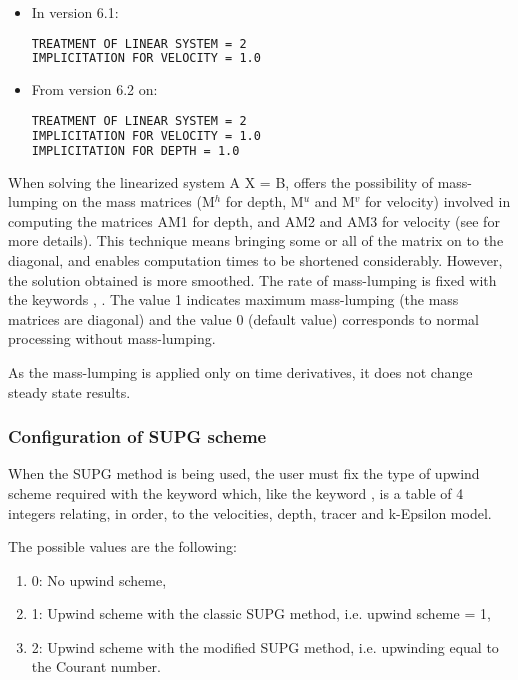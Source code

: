 \begin{itemize}
\item  In version 6.1:
\begin{lstlisting}[language=bash]
TREATMENT OF LINEAR SYSTEM = 2
IMPLICITATION FOR VELOCITY = 1.0
\end{lstlisting}
\item  From version 6.2 on:
\begin{lstlisting}[language=bash]
TREATMENT OF LINEAR SYSTEM = 2
IMPLICITATION FOR VELOCITY = 1.0
IMPLICITATION FOR DEPTH = 1.0
\end{lstlisting}
\end{itemize}

  When solving the linearized system A X = B,  offers the possibility of mass-lumping on the mass matrices (M${}^{h}$ for depth, M${}^{u}$ and M${}^{v}$ for velocity) involved in computing the matrices AM1 for depth, and AM2 and AM3 for velocity (see \cite{Hervouet2007} for more details). This technique means bringing some or all of the matrix on to the diagonal, and enables computation times to be shortened considerably. However, the solution obtained is more smoothed. The rate of mass-lumping is fixed with the keywords , . The value 1 indicates maximum mass-lumping (the mass matrices are diagonal) and the value 0 (default value) corresponds to normal processing without mass-lumping.

 As the mass-lumping is applied only on time derivatives, it does not change steady state results.
\subsubsection{  Configuration of SUPG scheme}

 When the SUPG method is being used, the user must fix the type of upwind scheme required with the keyword  which, like the keyword , is a table of 4 integers relating, in order, to the velocities, depth, tracer and k-Epsilon model.

 The possible values are the following:

\begin{enumerate}
\item[\nonumber]   0: No upwind scheme,

\item [\nonumber]  1: Upwind scheme with the classic SUPG method, i.e. upwind scheme = 1,

\item[\nonumber]   2: Upwind scheme with the modified SUPG method, i.e. upwinding equal to the Courant number.
\end{enumerate}

